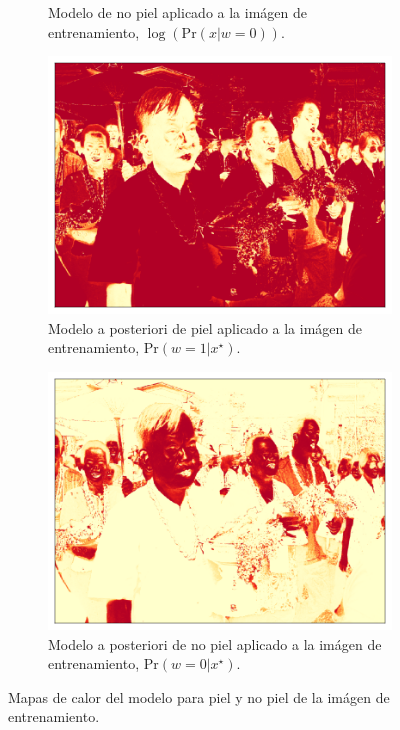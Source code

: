 \begin{figure}[h!]
\begin{subfigure}{0.4\textwidth}
        \caption{Modelo de no piel aplicado a la imágen de entrenamiento, $\log(\text{Pr}(x | w=0))$.}
        \label{fig:training_distbg}
    \end{subfigure}
    \begin{subfigure}{0.4\textwidth}
        \centering
        \includegraphics[width=\textwidth]{../figures/image1/image_01_postskin.png}
        \caption{Modelo a posteriori de piel aplicado a la imágen de entrenamiento, $\text{Pr}(w=1 | x^{\star})$.}
        \label{fig:training_postskin}
    \end{subfigure}
    \hspace{1cm}
    \begin{subfigure}{0.4\textwidth}
        \centering
        \includegraphics[width=\textwidth]{../figures/image1/image_01_postbg.png}
        \caption{Modelo a posteriori de no piel aplicado a la imágen de entrenamiento, $\text{Pr}(w=0 | x^{\star})$.}
        \label{fig:training_postbg}
    \end{subfigure}
    \caption{Mapas de calor del modelo para piel y no piel de la imágen de entrenamiento.}
    \label{fig:training}
\end{figure}

